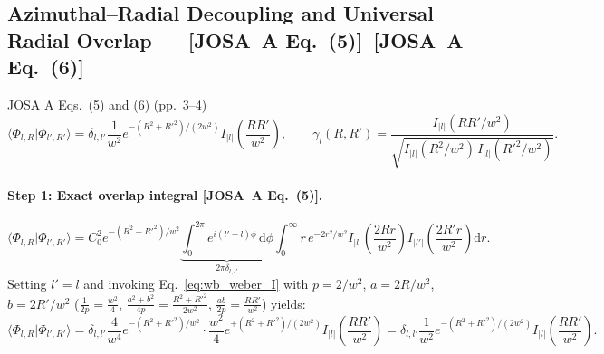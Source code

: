 \documentclass[10pt,letterpaper]{article}
\newcommand{\braket}[2]{\langle #1 | #2 \rangle}
\newcommand{\abs}[1]{\lvert #1 \rvert}
\newcommand{\dd}{\mathrm{d}}
\newcommand{\josa}[1]{\textbf{[JOSA~A Eq.~(#1)]}}
\numberwithin{equation}{section}
\begin{document}
\subsection{Azimuthal--Radial Decoupling and Universal Radial Overlap --- \josa{5}--\josa{6}}
\label{sec:s3_overlap}

\begin{targeteq}{JOSA A Eqs.~(5) and (6) (pp.~3--4)}
\[
  \braket{\Phi_{l,R}}{\Phi_{l',R'}} = \delta_{l,l'}\frac{1}{w^2}e^{-(R^2+R'^2)/(2w^2)} I_{\abs{l}}\!\left(\frac{RR'}{w^2}\right), \qquad
  \gamma_l(R,R') = \frac{I_{\abs{l}}(RR'/w^2)}{\sqrt{I_{\abs{l}}(R^2/w^2)\,I_{\abs{l}}(R'^2/w^2)}}.
\]
\end{targeteq}

\paragraph*{Step 1: Exact overlap integral \josa{5}.}
\begin{equation}
  \braket{\Phi_{l,R}}{\Phi_{l',R'}} = C_0^2 e^{-(R^2+R'^2)/w^2}\underbrace{\int_0^{2\pi} e^{i(l'-l)\phi}\,\dd\phi}_{2\pi\delta_{l,l'}} \int_0^\infty r\,e^{-2r^2/w^2} I_{\abs{l}}\!\left(\frac{2Rr}{w^2}\right) I_{\abs{l'}}\!\left(\frac{2R'r}{w^2}\right)\dd r.
\end{equation}
Setting $l' = l$ and invoking Eq.~\eqref{eq:wb_weber_I} with $p = 2/w^2$, $a = 2R/w^2$, $b = 2R'/w^2$ ($\frac{1}{2p} = \frac{w^2}{4}$, $\frac{a^2+b^2}{4p} = \frac{R^2+R'^2}{2w^2}$, $\frac{ab}{2p} = \frac{RR'}{w^2}$) yields:
\begin{equation}
  \braket{\Phi_{l,R}}{\Phi_{l',R'}} = \delta_{l,l'}\frac{4}{w^4} e^{-(R^2+R'^2)/w^2}\cdot\frac{w^2}{4} e^{+(R^2+R'^2)/(2w^2)} I_{\abs{l}}\!\left(\frac{RR'}{w^2}\right) = \delta_{l,l'}\frac{1}{w^2} e^{-(R^2+R'^2)/(2w^2)} I_{\abs{l}}\!\left(\frac{RR'}{w^2}\right).
\end{equation}
\end{document}
